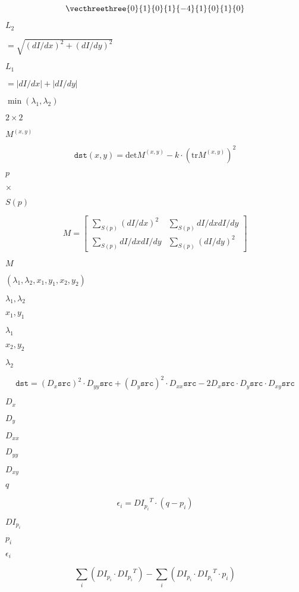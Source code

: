 \documentclass{article}
\begin{document}
\[\vecthreethree {0}{1}{0}{1}{-4}{1}{0}{1}{0}\]
\pagebreak

$L_2$
\pagebreak

$=\sqrt{(dI/dx)^2 + (dI/dy)^2}$
\pagebreak

$L_1$
\pagebreak

$=|dI/dx|+|dI/dy|$
\pagebreak

$\min(\lambda_1, \lambda_2)$
\pagebreak

$2\times2$
\pagebreak

$M^{(x,y)}$
\pagebreak

\[\texttt{dst} (x,y) = \mathrm{det} M^{(x,y)} - k \cdot \left ( \mathrm{tr} M^{(x,y)} \right )^2\]
\pagebreak

$p$
\pagebreak

$\times$
\pagebreak

$S(p)$
\pagebreak

\[M = \begin{bmatrix} \sum _{S(p)}(dI/dx)^2 & \sum _{S(p)}dI/dx dI/dy \\ \sum _{S(p)}dI/dx dI/dy & \sum _{S(p)}(dI/dy)^2 \end{bmatrix}\]
\pagebreak

$M$
\pagebreak

$(\lambda_1, \lambda_2, x_1, y_1, x_2, y_2)$
\pagebreak

$\lambda_1, \lambda_2$
\pagebreak

$x_1, y_1$
\pagebreak

$\lambda_1$
\pagebreak

$x_2, y_2$
\pagebreak

$\lambda_2$
\pagebreak

\[\texttt{dst} = (D_x \texttt{src} )^2 \cdot D_{yy} \texttt{src} + (D_y \texttt{src} )^2 \cdot D_{xx} \texttt{src} - 2 D_x \texttt{src} \cdot D_y \texttt{src} \cdot D_{xy} \texttt{src}\]
\pagebreak

$D_x$
\pagebreak

$D_y$
\pagebreak

$D_{xx}$
\pagebreak

$D_{yy}$
\pagebreak

$D_{xy}$
\pagebreak

$q$
\pagebreak

\[\epsilon _i = {DI_{p_i}}^T \cdot (q - p_i)\]
\pagebreak

${DI_{p_i}}$
\pagebreak

$p_i$
\pagebreak

$\epsilon_i$
\pagebreak

\[\sum _i(DI_{p_i} \cdot {DI_{p_i}}^T) - \sum _i(DI_{p_i} \cdot {DI_{p_i}}^T \cdot p_i)\]
\pagebreak
\end{document}

